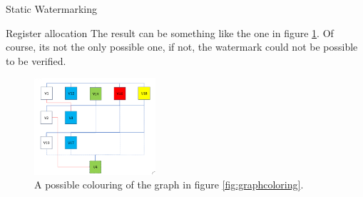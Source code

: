 \begin{section}{Static Watermarking}
\begin{subsection}{Register allocation}
    The result can be something like the one in figure \ref{fig:graphcoloring2}. Of course, its not 
    the only possible one, if not, the watermark could not be possible to be verified.
    \begin{figure}[H]
      \centering
      \includegraphics[width=0.4\textwidth]{img/hardware/register allocation 2.png}
      \caption{A possible colouring of the graph in figure \ref{fig:graphcoloring}.}
      \label{fig:graphcoloring2}
    \end{figure}
  \end{subsection}


\end{section}
